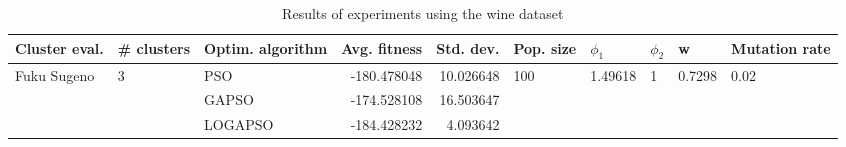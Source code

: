 \begin{table}
\centering
\caption{Results of experiments using the wine dataset}
\begin{tabular}{lllrrlllll}
\toprule
               Cluster eval. &        \# clusters & Optim. algorithm &  Avg. fitness &  Std. dev. &            Pop. size &               $\phi_{1}$ &         $\phi_{2}$ &                       w &         Mutation rate \\
\midrule
\multirow{3}{*}{Fuku Sugeno} & \multirow{3}{*}{3} &              PSO &   -180.478048 &  10.026648 & \multirow{3}{*}{100} & \multirow{3}{*}{1.49618} & \multirow{3}{*}{1} & \multirow{3}{*}{0.7298} & \multirow{3}{*}{0.02} \\
                             &                    &            GAPSO &   -174.528108 &  16.503647 &                      &                          &                    &                         &                       \\
                             &                    &          LOGAPSO &   -184.428232 &   4.093642 &                      &                          &                    &                         &                       \\
\bottomrule
\end{tabular}
\end{table}

